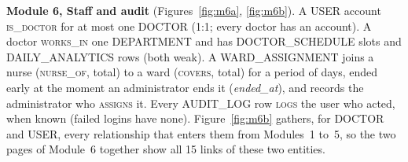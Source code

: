 \textbf{Module 6, Staff and audit} (Figures~\ref{fig:m6a}, \ref{fig:m6b}). A USER account \textsc{is\_doctor} for at
most one DOCTOR (1:1; every doctor has an account). A doctor \textsc{works\_in} one DEPARTMENT and has
DOCTOR\_SCHEDULE slots and DAILY\_ANALYTICS rows (both weak). A WARD\_ASSIGNMENT joins a nurse
(\textsc{nurse\_of}, total) to a ward (\textsc{covers}, total) for a period of days, ended early at the moment an
administrator ends it (\emph{ended\_at}), and records the administrator who \textsc{assigns} it. Every AUDIT\_LOG row \textsc{logs} the user who acted, when known (failed logins have none).
Figure~\ref{fig:m6b} gathers, for DOCTOR and USER, every relationship that enters them from Modules~1 to~5, so the
two pages of Module~6 together show all 15 links of these two entities.
